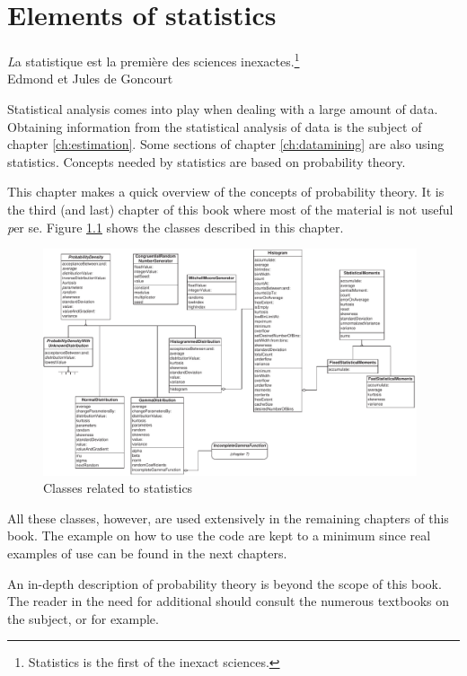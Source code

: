 %
%

\chapter{Elements of statistics}
\label{ch:statistics} \vspace{1 ex}
\begin{flushright} {\textsl La statistique est la premi\`ere des sciences inexactes.}\footnote{Statistics is the first of the inexact sciences.}\\
Edmond et Jules de Goncourt
\end{flushright}
\vspace{1 ex} Statistical analysis comes into play when dealing
with a large amount of data. Obtaining information from the
statistical analysis of data is the subject of chapter
\ref{ch:estimation}. Some sections of chapter \ref{ch:datamining}
are also using statistics. Concepts needed by statistics are based
on probability theory.

This chapter makes a quick overview of the concepts of probability
theory. It is the third (and last) chapter of this book where most
of the material is not useful {\textit per se}.
Figure \ref{fig:statisticsclasses} shows the classes described in this
chapter.
\begin{figure}
\centering\includegraphics[width=11cm]{Figures/StatisticsClasses}
\caption{Classes related to statistics}
\label{fig:statisticsclasses}
\end{figure}
All these classes, however, are used extensively in the remaining
chapters of this book. The example on how to use the code are kept
to a minimum since real examples of use can be found in the next
chapters.

An in-depth description of probability theory is beyond the scope
of this book. The reader in the need for additional should consult
the numerous textbooks on the subject, \cite{PhiTay} or
\cite{LawKel} for example.

